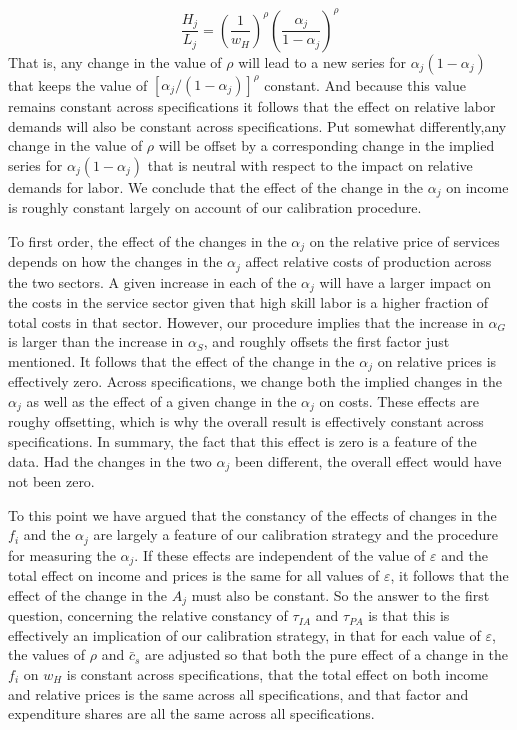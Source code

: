 \documentclass[12pt,english]{article}
\begin{document}
\begin{equation*}
\frac{H_{j}}{L_{j}}=\left(\frac{1}{w_{H}}\right)^{\rho }\left(\frac{\alpha _{j}}{1-\alpha
_{j}}\right)^{\rho }
\end{equation*}%
That is, any change in the value of $\rho $ will lead to a new series for $%
\alpha _{j}(1-\alpha _{j})$ that keeps the value of $[\alpha _{j}/(1-\alpha
_{j})]^{\rho }$ constant. And because this value remains constant across
specifications it follows that the effect on relative labor demands will
also be constant across specifications. Put somewhat differently,any change
in the value of $\rho $ will be offset by a corresponding change in the
implied series for $\alpha _{j}(1-\alpha _{j})$ that is neutral with respect
to the impact on relative demands for labor. We conclude that the effect of
the change in the $\alpha _{j}$ on income is roughly constant largely on
account of our calibration procedure.

To first order, the effect of the changes in the $\alpha _{j}$ on the
relative price of services depends on how the changes in the $\alpha _{j}$
affect relative costs of production across the two sectors. A given increase
in each of the $\alpha _{j}$ will have a larger impact on the costs in the
service sector given that high skill labor is a higher fraction of total
costs in that sector. However, our procedure implies that the increase in $%
\alpha _{G}$ is larger than the increase in $\alpha _{S}$, and roughly
offsets the first factor just mentioned. It follows that the effect of the
change in the $\alpha _{j}$ on relative prices is effectively zero. Across
specifications, we change both the implied changes in the $\alpha _{j}$ as
well as the effect of a given change in the $\alpha _{j}$ on costs. These
effects are roughy offsetting, which is why the overall result is
effectively constant across specifications. In summary, the fact that this
effect is zero is a feature of the data. Had the changes in the two $\alpha
_{j}$ been different, the overall effect would have not been zero.

To this point we have argued that the constancy of the effects of changes in
the $f_{i}$ and the $\alpha _{j}$ are largely a feature of our calibration
strategy and the procedure for measuring the $\alpha _{j}$. If these effects
are independent of the value of $\varepsilon $ and the total effect on
income and prices is the same for all values of $\varepsilon $, it follows
that the effect of the change in the $A_{j}$ must also be constant. So the
answer to the first question, concerning the relative constancy of $\tau
_{IA}$ and $\tau
_{PA}$ is that this is effectively an implication of our calibration
strategy, in that for each value of $\varepsilon $, the values of $\rho $
and $\bar{c}_{s}$ are adjusted so that both the pure effect of a change in
the $f_{i}$ on $w_{H}$ is constant across specifications, that the total
effect on both income and relative prices is the same across all
specifications, and that factor and expenditure shares are all the same
across all specifications.
\end{document}
